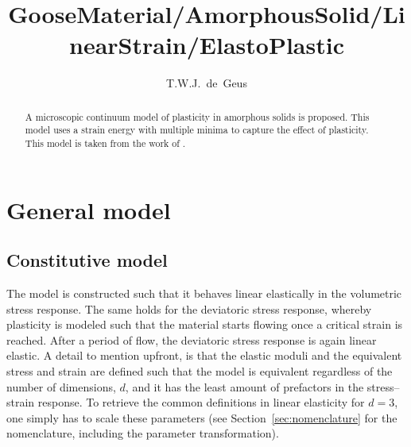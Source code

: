 \documentclass[times,namecite]{goose-article}
\title{%
  GooseMaterial/AmorphousSolid/LinearStrain/ElastoPlastic
}
\author{T.W.J.~de~Geus}
\begin{document}
\maketitle

\begin{abstract}
A microscopic continuum model of plasticity in amorphous solids is proposed. This model uses a strain energy with multiple minima to capture the effect of plasticity. This model is taken from the work of \citet{Jagla2017}.
\end{abstract}


\setcounter{tocdepth}{3}
\tableofcontents

\vfill\newpage
\section{General model}

\subsection{Constitutive model}

The model is constructed such that it behaves linear elastically in the volumetric stress response. The same holds for the deviatoric stress response, whereby plasticity is modeled such that the material starts flowing once a critical strain is reached. After a period of flow, the deviatoric stress response is again linear elastic. A detail to mention upfront, is that the elastic moduli and the equivalent stress and strain are defined such that the model is equivalent regardless of the number of dimensions, $d$, and it has the least amount of prefactors in the stress--strain response. To retrieve the common definitions in linear elasticity for $d = 3$, one simply has to scale these parameters (see Section~\ref{sec:nomenclature} for the nomenclature, including the parameter transformation).
\end{document}
